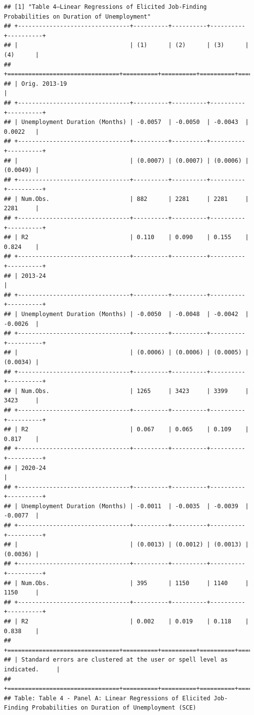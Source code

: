 \documentclass[
]{article}
\begin{document}
\begin{verbatim}
## [1] "Table 4—Linear Regressions of Elicited Job-Finding Probabilities on Duration of Unemployment"
## +--------------------------------+----------+----------+----------+----------+
## |                                | (1)      | (2)      | (3)      | (4)      |
## +================================+==========+==========+==========+==========+
## | Orig. 2013-19                                                              |
## +--------------------------------+----------+----------+----------+----------+
## | Unemployment Duration (Months) | -0.0057  | -0.0050  | -0.0043  | 0.0022   |
## +--------------------------------+----------+----------+----------+----------+
## |                                | (0.0007) | (0.0007) | (0.0006) | (0.0049) |
## +--------------------------------+----------+----------+----------+----------+
## | Num.Obs.                       | 882      | 2281     | 2281     | 2281     |
## +--------------------------------+----------+----------+----------+----------+
## | R2                             | 0.110    | 0.090    | 0.155    | 0.824    |
## +--------------------------------+----------+----------+----------+----------+
## | 2013-24                                                                    |
## +--------------------------------+----------+----------+----------+----------+
## | Unemployment Duration (Months) | -0.0050  | -0.0048  | -0.0042  | -0.0026  |
## +--------------------------------+----------+----------+----------+----------+
## |                                | (0.0006) | (0.0006) | (0.0005) | (0.0034) |
## +--------------------------------+----------+----------+----------+----------+
## | Num.Obs.                       | 1265     | 3423     | 3399     | 3423     |
## +--------------------------------+----------+----------+----------+----------+
## | R2                             | 0.067    | 0.065    | 0.109    | 0.817    |
## +--------------------------------+----------+----------+----------+----------+
## | 2020-24                                                                    |
## +--------------------------------+----------+----------+----------+----------+
## | Unemployment Duration (Months) | -0.0011  | -0.0035  | -0.0039  | -0.0077  |
## +--------------------------------+----------+----------+----------+----------+
## |                                | (0.0013) | (0.0012) | (0.0013) | (0.0036) |
## +--------------------------------+----------+----------+----------+----------+
## | Num.Obs.                       | 395      | 1150     | 1140     | 1150     |
## +--------------------------------+----------+----------+----------+----------+
## | R2                             | 0.002    | 0.019    | 0.118    | 0.838    |
## +================================+==========+==========+==========+==========+
## | Standard errors are clustered at the user or spell level as indicated.     |
## +================================+==========+==========+==========+==========+
## Table: Table 4 - Panel A: Linear Regressions of Elicited Job-Finding Probabilities on Duration of Unemployment (SCE)
\end{verbatim}
\end{document}
